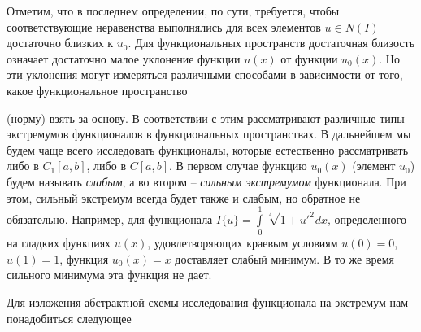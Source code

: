 
	Отметим, что в последнем определении, по сути, требуется, чтобы соответствующие неравенства выполнялись для всех элементов $u\in N(I)$ достаточно близких к $u_0$. Для функциональных пространств достаточная близость означает достаточно малое уклонение функции $u(x)$ от функции $u_0(x)$. Но эти уклонения могут измеряться различными способами в зависимости от того, какое функциональное пространство

	\newpage
	\noindent
	(норму) взять за основу. В соответствии с этим рассматривают различные типы экстремумов функционалов в функциональных пространствах. В дальнейшем мы будем чаще всего исследовать функционалы, которые естественно рассматривать либо в $C_1[a, b]$, либо в $C[a, b]$. В первом случае функцию $u_0(x)$ (элемент $u_0$) будем называть {\it слабым}, а во втором – {\it сильным экстремумом} функционала. При этом, сильный экстремум всегда будет также и слабым, но обратное не обязательно. Например, для функционала $I\{u\} = \int\limits_0^1 \sqrt[4]{1+u'^2} dx$, определенного на гладких функциях $u(x)$, удовлетворяющих краевым условиям $u(0)=0$, $u(1)=1$, функция
	$u_0(x)=x$ доставляет слабый минимум. В то же время сильного минимума эта функция не дает.

	Для изложения абстрактной схемы исследования функционала на экстремум нам понадобиться следующее


